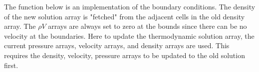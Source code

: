 The function below is an implementation of the boundary conditions. The density of the new solution array is "fetched" from the adjacent cells in the old density array. The $\rho V$ arrays are always set to zero at the bounds since there can be no velocity at the boundaries. Here to update the thermodynamic solution array, the current pressure arrays, velocity arrays, and density arrays are used. This requires the density, velocity, pressure arrays to be updated to the old solution first.
